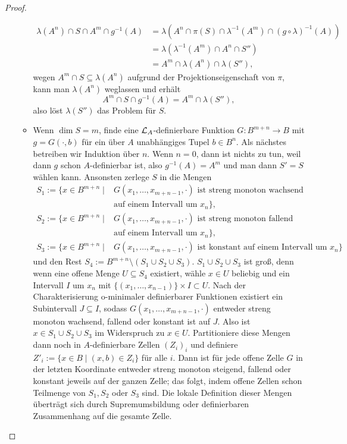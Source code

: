 \begin{proof}
\begin{itemize}
\begin{itemize}
			\begin{align*}
			\lambda(A^n)\cap S\cap A^m\cap g^{-1}(A)&=\lambda(A^n\cap\pi(S)\cap\lambda^{-1}(A^m)\cap (g\circ\lambda)^{-1}(A))\\
			&=\lambda(\lambda^{-1}(A^m)\cap A^n\cap S'')\\
			&=A^m\cap\lambda(A^n)\cap\lambda(S''),
			\end{align*}
			wegen $A^m\cap S\subseteq\lambda(A^n)$ aufgrund der Projektionseigenschaft von $\pi$, kann man $\lambda(A^n)$ weglassen und erhält $$A^m\cap S\cap g^{-1}(A)=A^m\cap\lambda(S''),$$
			also löst $\lambda(S'')$ das Problem für $S$.
			\newpage
			\item Wenn $\dim S=m$, finde eine $\mathcal{L}_A$-definierbare Funktion $G:B^{m+n}\rightarrow B$ mit $g=G(\cdot,b)$ für ein über $A$ unabhängiges Tupel $b\in B^n$. Als nächstes betreiben wir Induktion über $n$. Wenn $n=0$, dann ist nichts zu tun, weil dann $g$ schon $A$-definierbar ist, also $g^{-1}(A)=A^m$ und man dann $S'=S$ wählen kann. Ansonsten zerlege $S$ in die Mengen
			\begin{align*}
			S_1:=\{x\in B^{m+n}\mid&G(x_1,\dots,x_{m+n-1},\cdot)\text{ ist streng monoton wachsend }\\&\text{auf einem Intervall um }x_n\},\\S_2:=\{x\in B^{m+n}\mid&G(x_1,\dots,x_{m+n-1},\cdot)\text{ ist streng monoton fallend }\\&\text{auf einem Intervall um }x_n\},\\S_3:=\{x\in B^{m+n}\mid&G(x_1,\dots,x_{m+n-1},\cdot)\text{ ist konstant auf einem Intervall um }x_n\}
			\end{align*}
			und den Rest $S_4:=B^{m+n}\setminus(S_1\cup S_2\cup S_3)$.
			$S_1\cup S_2\cup S_3$ ist groß, denn wenn eine offene Menge $U\subseteq S_4$ existiert, wähle $x\in U$ beliebig und ein Intervall $I$ um $x_n$ mit $\{(x_1,\dots,x_{n-1})\}\times I\subset U$. Nach der Charakterisierung o-minimaler definierbarer Funktionen existiert ein Subintervall $J\subseteq I$, sodass $G(x_1,\dots,x_{m+n-1},\cdot)$ entweder streng monoton wachsend, fallend oder konstant ist auf $J$. Also ist $x\in S_1\cup S_2\cup S_3$ im Widerspruch zu $x\in U$.
			Partitioniere diese Mengen dann noch in $A$-definierbare Zellen $(Z_i)_i$ und definiere $Z'_i:=\{x\in B\mid (x,b)\in Z_i\}$ für alle $i$. Dann ist für jede offene Zelle $G$ in der letzten Koordinate entweder streng monoton steigend, fallend oder konstant jeweils auf der ganzen Zelle; das folgt, indem offene Zellen schon Teilmenge von $S_1,S_2$ oder $S_3$ sind. Die lokale Definition dieser Mengen überträgt sich durch Supremumsbildung oder definierbaren Zusammenhang auf die gesamte Zelle.\\

\end{itemize}
\end{itemize}
\end{proof}
